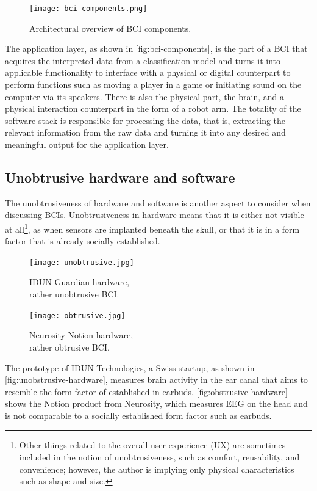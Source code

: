 \begin{figure}[!ht]
  \centering
  \texttt{[image: bci-components.png]}
  \caption{Architectural overview of BCI components.}
  \label{fig:bci-components}
\end{figure}

The application layer, as shown in \autoref{fig:bci-components}, is the part of a BCI that acquires the interpreted data from a classification model and turns it into applicable functionality to interface with a physical or digital counterpart to perform functions such as moving a player in a game or initiating sound on the computer via its speakers. There is also the physical part, the brain, and a physical interaction counterpart in the form of a robot arm. The totality of the software stack is responsible for processing the data, that is, extracting the relevant information from the raw data and turning it into any desired and meaningful output for the application layer.

\subsection{Unobtrusive hardware and software}
\label{chapter2-unobtrusive-hardware-and-software}

The unobtrusiveness of hardware and software is another aspect to consider when discussing BCIs. Unobtrusiveness in hardware means that it is either not visible at all\footnote{Other things related to the overall user experience (UX) are sometimes included in the notion of unobtrusiveness, such as comfort, reusability, and convenience; however, the author is implying only physical characteristics such as shape and size.}, as when sensors are implanted beneath the skull, or that it is in a form factor that is already socially established.

\begin{figure}[!ht]
  \texttt{[image: unobtrusive.jpg]}
  \caption{IDUN Guardian hardware, \\ rather unobtrusive BCI.}
  \label{fig:unobstrusive-hardware}
  \endminipage\hfill
  \texttt{[image: obtrusive.jpg]}
  \caption{Neurosity Notion hardware, \\ rather obtrusive BCI.}
  \label{fig:obstrusive-hardware}
  \endminipage\hfill
\end{figure}

The prototype of IDUN Technologies, a Swiss startup, as shown in \autoref{fig:unobstrusive-hardware}, measures brain activity in the ear canal that aims to resemble the form factor of established in-earbuds. \autoref{fig:obstrusive-hardware} shows the Notion product from Neurosity, which measures EEG on the head and is not comparable to a socially established form factor such as earbuds.

